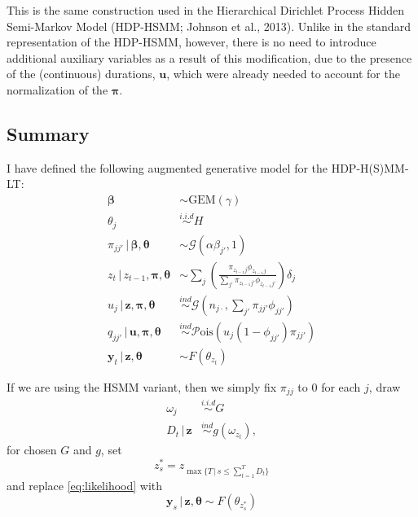 \documentclass[12pt,letterpaper]{report}
\newcommand{\Pois}[1]{\mathcal{P}\mathrm{ois}(#1)}
\newcommand{\Gamm}[2]{\mathcal{G}(#1,#2)}
\newcommand{\given}{\, \vert \,}
\newcommand{\by}{\mathbf{y}}
\newcommand{\bz}{\mathbf{z}}
\newcommand{\bu}{\mathbf{u}}
\newcommand{\bbeta}{\boldsymbol{\beta}}
\newcommand{\btheta}{\boldsymbol{\theta}}
\newcommand{\bpi}{\boldsymbol{\pi}}
\begin{document}
This is the same construction used in the Hierarchical Dirichlet
Process Hidden Semi-Markov Model (HDP-HSMM; Johnson et al.,
2013).  Unlike in the standard representation of the HDP-HSMM,
however, there is no need to introduce
additional auxiliary variables as a result of this modification, due
to the presence of the (continuous) durations, $\bu$, which were
already needed to account for the normalization of the $\bpi$.

\subsection{Summary}
\label{sec:model-summary}

I have defined the following augmented generative model for the
HDP-H(S)MM-LT:
\begin{align}
  \label{eq:96}
  \bbeta &\sim \mathrm{GEM}(\gamma) \\
  \theta_j &\stackrel{i.i.d}{\sim} H \\
  \pi_{jj'} \given \bbeta, \btheta &\sim \Gamm{\alpha \beta_{j'}}{1}
  \\
  z_{t} \given z_{t-1}, \bpi, \btheta &\sim \sum_{j}
  \left(\frac{\pi_{z_{t-1}j}\phi_{z_{t-1}j}}{\sum_{j'}
    \pi_{z_{t-1}j'}\phi_{z_{t-1}j'}}\right)\delta_j \\
  u_j \given \bz, \bpi, \btheta &\stackrel{ind}{\sim}
  \Gamm{n_{j\cdot}}{\sum_{j'} \pi_{jj'}\phi_{jj'}} \\
  q_{jj'} \given \bu, \bpi, \btheta &\stackrel{ind}{\sim}
  \Pois{u_j(1 - \phi_{jj'})\pi_{jj'}} \\
  \label{eq:likelihood} \by_t \given \bz, \btheta &\sim F(\theta_{z_t})
\end{align}

If we are using the HSMM variant, then we simply fix $\pi_{jj}$ to 0
for each $j$, draw
\begin{align}
  \label{eq:97}
  \omega_j &\stackrel{i.i.d}{\sim} G \\
  D_t \given \bz &\stackrel{ind}{\sim} g(\omega_{z_t}),
\end{align}
for chosen $G$ and $g$, set
\begin{equation}
  \label{eq:98}
  z^*_s = z_{\max\{T \given s \leq \sum_{t=1}^T D_t\}}
\end{equation}
and replace \eqref{eq:likelihood} with
\begin{equation}
  \label{eq:likelihood-hsmm} \by_s \given \bz, \btheta \sim F(\theta_{z^*_s})
\end{equation}
\end{document}
